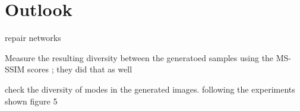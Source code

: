 \section{Outlook}\label{ausblick}


repair networks
\cite{Tanno2022repairingneuralnetworkfromcorrupt}


Measure the resulting diversity between the generatoed samples using the MS-SSIM scores \cite{Odena201710.5555/3305890.3305954}; they did that as well

check the diversity of modes in the generated images. following the experiments shown figure 5 



\newpage
